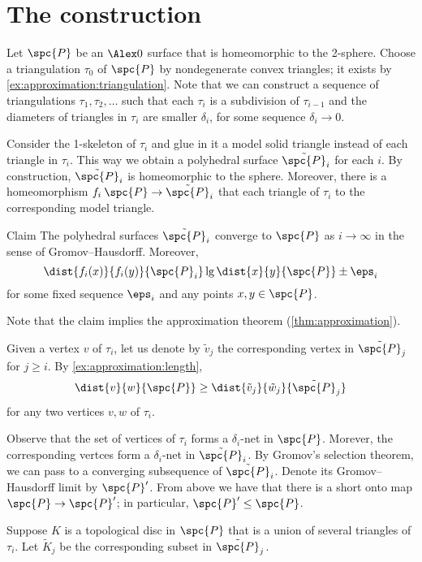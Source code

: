 
\section{The construction}

Let $\spc{P}$ be an $\Alex0$ surface that is homeomorphic to the 2-sphere.
Choose a triangulation $\tau_0$ of $\spc{P}$ by nondegenerate convex triangles; it exists by \ref{ex:approximation:triangulation}.
Note that we can construct a sequence of triangulations $\tau_1,\tau_2,\dots$ such that each $\tau_i$ is a subdivision of $\tau_{i-1}$ and the diameters of triangles in $\tau_i$ are smaller $\delta_i$, for some sequence $\delta_i\to 0$.

Consider the 1-skeleton of $\tau_i$ and glue in it a model solid triangle instead of each triangle in $\tau_i$.
This way we obtain a polyhedral surface $\tilde{\spc{P}}_i$ for each $i$.
By construction, $\tilde{\spc{P}}_i$ is homeomorphic to the sphere.
Moreover, there is a homeomorphism $f_i\:\spc{P}\to\tilde{\spc{P}}_i$ that each triangle of $\tau_i$ to the corresponding model triangle.


\begin{thm}{Claim}
The polyhedral surfaces $\tilde{\spc{P}}_i$ converge to $\spc{P}$ as $i\to\infty$ in the sense of Gromov--Hausdorff.
Moreover,
\[\dist{f_i(x)}{f_i(y)}{\spc{P}_i}\lg\dist{x}{y}{\spc{P}}\pm\eps_i\]
for some fixed sequence $\eps_i$ and any points $x,y\in \spc{P}$.
\end{thm}

Note that the claim implies the approximation theorem (\ref{thm:approximation}).

Given a vertex $v$ of $\tau_i$, let us denote by $\tilde v_j$ the corresponding vertex in $\tilde{\spc{P}}_j$ for $j\ge i$.
By \ref{ex:approximation:length},
\[\dist{v}{w}{\spc{P}}\ge \dist{\tilde v_j}{\tilde w_j}{\tilde{\spc{P}}_j}\]
for any two vertices $v,w$ of $\tau_i$.

Observe that the set of vertices of $\tau_i$ forms a $\delta_i$-net in $\spc{P}$.
Morever, the corresponding vertces form a $\delta_i$-net in $\tilde{\spc{P}}_i$.
By Gromov's selection theorem, we can pass to a converging subsequence of $\tilde{\spc{P}}_i$.
Denote its Gromov--Hausdorff limit by $\spc{P}'$.
From above we have that there is a short onto map $\spc{P}\to \spc{P}'$;
in particular, $\spc{P}'\le \spc{P}$.

Suppose $K$ is a topological disc in $\spc{P}$ that is a union of several triangles of $\tau_i$.
Let $\tilde K_j$ be the corresponding subset in $\tilde{\spc{P}}_j$.




